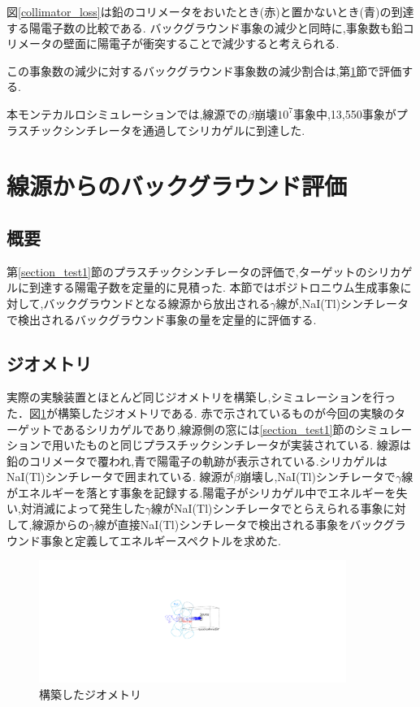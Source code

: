 図\ref{collimator_loss}は鉛のコリメータをおいたとき(赤)と置かないとき(青)の到達する陽電子数の比較である.
バックグラウンド事象の減少と同時に,事象数も鉛コリメータの壁面に陽電子が衝突することで減少すると考えられる.

この事象数の減少に対するバックグラウンド事象数の減少割合は,第\ref{section_test2}節で評価する.

本モンテカルロシミュレーションでは,線源での$\beta$崩壊$10^7$事象中,13,550事象がプラスチックシンチレータを通過してシリカゲルに到達した.



\section{線源からのバックグラウンド評価}
\label{section_test2}

\subsection{概要}
第\ref{section_test1}節のプラスチックシンチレータの評価で,ターゲットのシリカゲルに到達する陽電子数を定量的に見積った.
本節ではポジトロニウム生成事象に対して,バックグラウンドとなる線源から放出される$\gamma$線が,NaI(Tl)シンチレータで検出されるバックグラウンド事象の量を定量的に評価する.


\subsection{ジオメトリ}
実際の実験装置とほとんど同じジオメトリを構築し,シミュレーションを行った．図\ref{test2_geometry}が構築したジオメトリである.
赤で示されているものが今回の実験のターゲットであるシリカゲルであり,線源側の窓には\ref{section_test1}節のシミュレーションで用いたものと同じプラスチックシンチレータが実装されている.
線源は鉛のコリメータで覆われ,青で陽電子の軌跡が表示されている.シリカゲルはNaI(Tl)シンチレータで囲まれている.
線源が$\beta$崩壊し,NaI(Tl)シンチレータで$\gamma$線がエネルギーを落とす事象を記録する.陽電子がシリカゲル中でエネルギーを失い,対消滅によって発生した$\gamma$線がNaI(Tl)シンチレータでとらえられる事象に対して,線源からの$\gamma$線が直接NaI(Tl)シンチレータで検出される事象をバックグラウンド事象と定義してエネルギースペクトルを求めた.

\begin{figure}[!tbp]
	\centering
		\includegraphics[width=10cm]{img/test2_geometry.pdf}
	\caption{構築したジオメトリ}
	\label{test2_geometry}
\end{figure}

